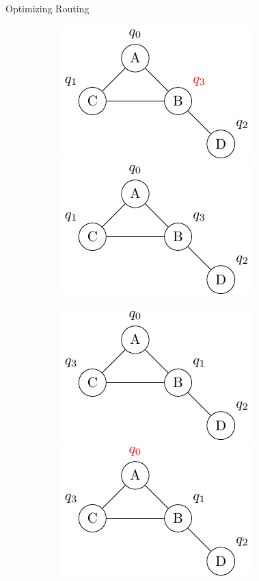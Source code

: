 \documentclass{beamer}
\begin{document}
\begin{frame}{Optimizing Routing}
\begin{figure}
\begin{subfigure}[b]{0.45\textwidth}
\begin{overprint}
		\centering
		\includegraphics[scale=0.6]{figures/pi_1_5}
		\onslide<10->\centering
		\includegraphics[scale=0.6]{figures/pi_1_6}
		\end{overprint}
     \end{subfigure}
     \hfill %
     \begin{subfigure}[b]{0.45\textwidth}
		\begin{overprint}
		\centering
		\includegraphics[scale=0.6]{figures/pi_2_1}	
		\onslide<6>\centering
		\includegraphics[scale=0.6]{figures/pi_2_2}

\end{overprint}
\end{subfigure}
\end{figure}
\end{frame}
\end{document}
